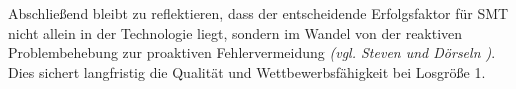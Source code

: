 Abschließend bleibt zu reflektieren, dass der entscheidende Erfolgsfaktor für \acs{SMT} nicht allein in der Technologie liegt, sondern im Wandel von der reaktiven Problembehebung zur proaktiven Fehlervermeidung \textit{(\acs{vgl.} Steven und Dörseln \cite[11]{1})}. Dies sichert langfristig die Qualität und Wettbewerbsfähigkeit bei Losgröße 1.

